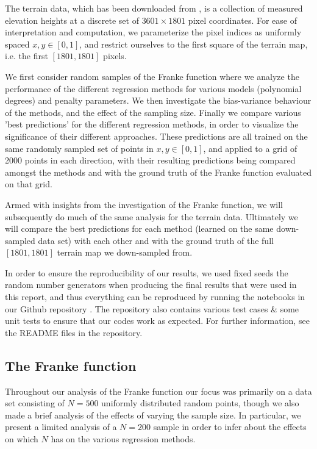 \documentclass[reprint, english, nofootinbib]{revtex4-2}
\begin{document}
The terrain data, which has been downloaded from \cite{4155_repo}, is a collection of measured elevation heights at a discrete set of $3601\times1801$ pixel coordinates. For ease of interpretation and computation, we parameterize the pixel indices as uniformly spaced $x,y \in [0,1]$, and restrict ourselves to the first square of the terrain map, i.e. the first $[1801,1801]$ pixels.

We first consider random samples of the Franke function where we analyze the performance of the different regression methods for various models (polynomial degrees) and penalty parameters. We then investigate the bias-variance behaviour of the methods, and the effect of the sampling size.  Finally we compare various 'best predictions' for the different regression methods, in order to visualize the significance of their different approaches. These predictions are all trained on the same randomly sampled set of points in $x,y \in [0,1]$, and applied to a grid of 2000 points in each direction, with their resulting predictions being compared amongst the methods and with the ground truth of the Franke function evaluated on that grid.

Armed with insights from the investigation of the Franke function, we will subsequently do much of the same analysis for the terrain data. Ultimately we will compare the best predictions for each method (learned on the same down-sampled data set) with each other and with the ground truth of the full $[1801,1801]$ terrain map we down-sampled from.

In order to ensure the reproducibility of our results, we used fixed seeds the random number generators when producing the final results that were used in this report, and thus everything can be reproduced by running the notebooks in our Github repository \cite{our_repo}. The repository also contains various test cases \& some unit tests to ensure that our codes work as expected. For further information, see the README files in the repository.

\subsection{The Franke function}

\noindent
Throughout our analysis of the Franke function our focus was primarily on a data set consisting of $N=500$ uniformly distributed random points, though we also made a brief analysis of the effects of varying the sample size. In particular, we present a limited analysis of a $N=200$ sample in order to infer about the effects on which $N$ has on the various regression methods.
\end{document}
